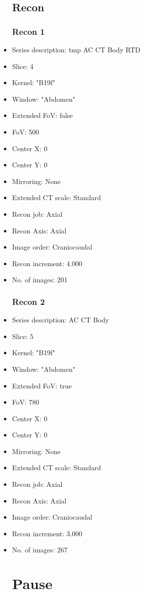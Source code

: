 \documentclass[12pt]{article}
\begin{document}
\begin{itemize}
\subsection{Recon}

\subsubsection{Recon 1}
\item Series description: tmp AC CT Body RTD
\item Slice: 4
\item Kernel: "B19f"
\item Window: "Abdomen"
\item Extended FoV: false
\item FoV: 500
\item Center X: 0
\item Center Y: 0
\item Mirroring: None
\item Extended CT scale: Standard
\item Recon job: Axial
\item Recon Axis: Axial
\item Image order: Craniocaudal
\item Recon increment: 4.000
\item No. of images: 201
\subsubsection{Recon 2}
\item Series description: AC CT Body
\item Slice: 5
\item Kernel: "B19f"
\item Window: "Abdomen"
\item Extended FoV: true
\item FoV: 780
\item Center X: 0
\item Center Y: 0
\item Mirroring: None
\item Extended CT scale: Standard
\item Recon job: Axial
\item Recon Axis: Axial
\item Image order: Craniocaudal
\item Recon increment: 3.000
\item No. of images: 267
\section{Pause}


\end{itemize}
\end{document}
